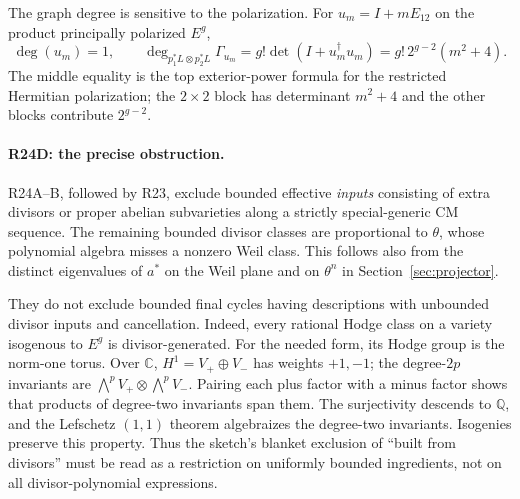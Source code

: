 \documentclass[11pt,a4paper]{article}
\theoremstyle{definition}\newtheorem{definition}[theorem]{Definition}
\theoremstyle{remark}\newtheorem{remark}[theorem]{Remark}
\newcommand{\Q}{\mathbb Q}\newcommand{\Z}{\mathbb Z}\newcommand{\C}{\mathbb C}\newcommand{\R}{\mathbb R}
\begin{document}
The graph degree is sensitive to the polarization. For $u_m=I+mE_{12}$ on the product principally polarized $E^g$,
\begin{equation}\label{eq:unipotentgraph}
 \deg(u_m)=1,\qquad
 \deg_{p_1^*L\otimes p_2^*L}\Gamma_{u_m}
 =g!\det(I+u_m^\dagger u_m)
 =g!\,2^{g-2}(m^2+4).
\end{equation}
The middle equality is the top exterior-power formula for the restricted Hermitian polarization; the $2\times2$ block has determinant $m^2+4$ and the other blocks contribute $2^{g-2}$.

\paragraph{R24D: the precise obstruction.}
R24A--B, followed by R23, exclude bounded effective \emph{inputs} consisting of extra divisors or proper abelian subvarieties along a strictly special-generic CM sequence. The remaining bounded divisor classes are proportional to $\theta$, whose polynomial algebra misses a nonzero Weil class. This follows also from the distinct eigenvalues of $a^*$ on the Weil plane and on $\theta^n$ in Section~\ref{sec:projector}.

They do not exclude bounded final cycles having descriptions with unbounded divisor inputs and cancellation. Indeed, every rational Hodge class on a variety isogenous to $E^g$ is divisor-generated. For the needed form, its Hodge group is the norm-one torus. Over $\C$, $H^1=V_+\oplus V_-$ has weights $+1,-1$; the degree-$2p$ invariants are $\bigwedge^pV_+\otimes\bigwedge^pV_-$. Pairing each plus factor with a minus factor shows that products of degree-two invariants span them. The surjectivity descends to $\Q$, and the Lefschetz $(1,1)$ theorem algebraizes the degree-two invariants. Isogenies preserve this property. Thus the sketch's blanket exclusion of ``built from divisors'' must be read as a restriction on uniformly bounded ingredients, not on all divisor-polynomial expressions.
\end{document}
